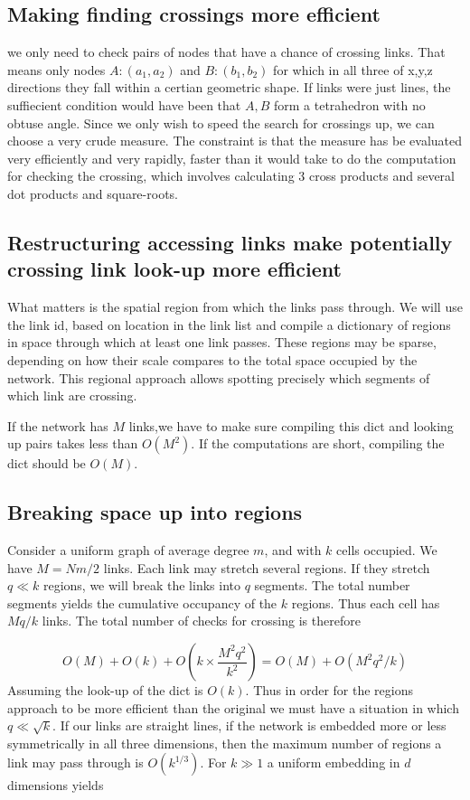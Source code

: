 \documentclass[nofootinbib,preprint,floatfix,titlepage,superscriptaddress]{revtex4} %
\begin{document}
\subsection{Making finding crossings more efficient}
we only need to check pairs of nodes that have a chance of crossing links. That means only nodes $A:(a_1,a_2)$ and $B:(b_1,b_2)$ for which in all three of x,y,z directions they fall within a certian geometric shape. If links were just lines, the suffiecient condition would have been that $A,B$ form a tetrahedron with no obtuse angle. Since we only wish to speed the search for crossings up, we can choose a very crude measure. The constraint is that the measure has be evaluated very efficiently and very rapidly, faster than it would take to do the computation for checking the crossing, which involves calculating 3 cross products and several dot products and square-roots. 
\subsection{ Restructuring accessing links make potentially crossing link look-up more efficient}

What matters is the spatial region from which the links pass through. We will use the link id, based on location in the link list and compile a dictionary of regions in space through which at least one link passes. These regions may be sparse, depending on how their scale compares to the total space occupied by the network. This regional approach allows spotting precisely which segments of which link are crossing. 


If the network has $M$ links,we have to make sure compiling this dict and looking up pairs takes less than $O(M^2)$. If the computations are short, compiling the dict should be $O(M)$. 


\subsection{Breaking space up into regions}
Consider a uniform graph of average degree $m$, and with $k$ cells occupied. We have $M = Nm/2$ links. Each link may stretch several regions. If they stretch $q \ll k $ regions, we will break the links into $q$ segments. The total number segments yields the cumulative occupancy of the $k$ regions. Thus each cell has $Mq/k$ links. The total number of checks for crossing is therefore


$$ O(M) + O(k)+ O\left( k \times \frac{M^2 q^2 }{ k^2} \right)= O(M)+ O(M^2 q^2/k) $$
Assuming the look-up of the dict is $O(k)$. Thus in order for the regions approach to be more efficient than the original we must have a situation in which $q \ll \sqrt{k}$. If our links are straight lines, if the network is embedded more or less symmetrically in all three dimensions, then the maximum number of regions a link may pass through is $O(k^{1/3})$. For $k \gg 1$ a uniform embedding in $d$ dimensions yields 
\end{document}

